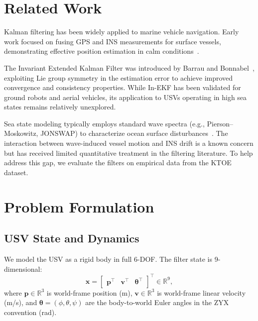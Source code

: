 \documentclass[conference]{IEEEtran}
\begin{document}
\section{Related Work}
\label{sec:related}

Kalman filtering has been widely applied to marine vehicle navigation. Early work focused on fusing GPS and INS measurements for surface vessels, demonstrating effective position estimation in calm conditions~\cite{hawaii_usv}.

The Invariant Extended Kalman Filter was introduced by Barrau and Bonnabel~\cite{barrau2017invariant}, exploiting Lie group symmetry in the estimation error to achieve improved convergence and consistency properties. While In-EKF has been validated for ground robots and aerial vehicles, its application to USVs operating in high sea states remains relatively unexplored.

Sea state modeling typically employs standard wave spectra (e.g., Pierson--Moskowitz, JONSWAP) to characterize ocean surface disturbances~\cite{fossen2011handbook}. The interaction between wave-induced vessel motion and INS drift is a known concern but has received limited quantitative treatment in the filtering literature. To help address this gap, we evaluate the filters on empirical data from the KTOE dataset.

\section{Problem Formulation}
\label{sec:problem}

\subsection{USV State and Dynamics}

We model the USV as a rigid body in full 6-DOF. The filter state is 9-dimensional:
\begin{equation}
  \mathbf{x} = \begin{bmatrix} \mathbf{p}^\top & \mathbf{v}^\top & \boldsymbol{\theta}^\top \end{bmatrix}^\top \in \mathbb{R}^9,
  \label{eq:state}
\end{equation}
where $\mathbf{p} \in \mathbb{R}^3$ is world-frame position (m), $\mathbf{v} \in \mathbb{R}^3$ is world-frame linear velocity (m/s), and $\boldsymbol{\theta} = (\phi, \theta, \psi)$ are the body-to-world Euler angles in the ZYX convention (rad).
\end{document}
